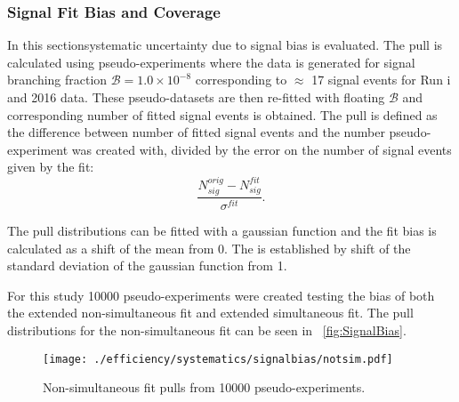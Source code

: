 \subsubsection{Signal Fit Bias and Coverage}
In this section\DIFaddbegin {}\DIFaddend systematic uncertainty due to signal bias is evaluated. The pull is calculated using pseudo-experiments where the data is generated for \DIFaddbegin {}\DIFaddend signal branching fraction $\mathcal{B}= 1.0\times 10^{-8}$ corresponding to $\approx$ 17 signal events for Run \Rn{1} and 2016 data.
These pseudo-datasets are then re-fitted with floating $\mathcal{B}$ and \DIFaddbegin {}\DIFaddend corresponding number of fitted signal events is obtained. The pull is defined as the difference between number of fitted signal events and the number \DIFdelbegin {}\DIFdelend \DIFaddbegin {}\DIFaddend pseudo-experiment was created with, divided by the error on the number of signal events given by the fit:
\begin{equation}
\frac{N^{orig}_{sig}-N^{fit}_{sig}}{\sigma^{fit}}.
\end{equation}

The pull distributions can be fitted with a gaussian function and the fit bias is calculated as a shift of the mean from 0. The \DIFdelbegin {}\DIFdelend \DIFaddbegin {}\DIFaddend is established by shift of the standard deviation of the gaussian function from 1.

For this study 10000 pseudo-experiments were created testing the bias \DIFdelbegin {}\DIFdelend of both the extended non-simultaneous fit and extended simultaneous fit. The pull distributions for the non-simultaneous fit can be seen in ~\autoref{fig:SignalBias}.
\begin{figure}[H]
\centering
\texttt{[image: ./efficiency/systematics/signalbias/notsim.pdf]}
\caption{Non-simultaneous fit pulls from 10000 pseudo-experiments.}
\label{fig:SignalBias}
\end{figure}


